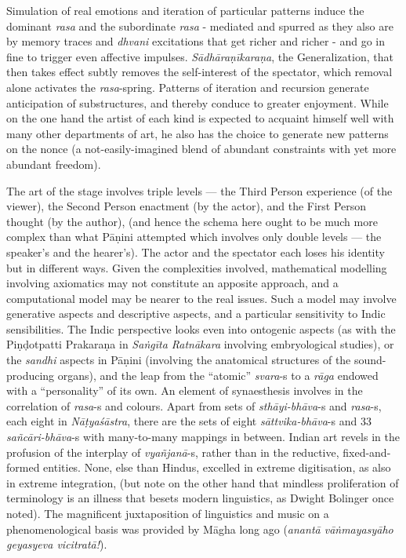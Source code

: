 Simulation of real emotions and iteration of particular patterns induce the dominant \textsl{rasa} and the subordinate \textsl{rasa} - mediated and spurred as they also are by memory traces and \textsl{dhvani} excitations that get richer and richer - and go in fine to trigger even affective impulses. \textsl{Sādhāraṇīkaraṇa}, the Generalization, that then takes effect subtly removes the self-interest of the spectator, which removal alone activates the \textsl{rasa}-spring. Patterns of iteration and recursion generate anticipation of substructures, and thereby conduce to greater enjoyment. While on the one hand the artist of each kind is expected to acquaint himself well with many other departments of art, he also has the choice to generate new patterns on the nonce (a not-easily-imagined blend of abundant constraints with yet more abundant freedom).

The art of the stage involves triple levels --- the Third Person experience (of the viewer), the Second Person enactment (by the actor), and the First Person thought (by the author), (and hence the schema here ought to be much more complex than what Pāṇini attempted which involves only double levels --- the speaker’s and the hearer’s). The actor and the spectator each loses his identity but in different ways. Given the complexities involved, mathematical modelling involving axiomatics may not constitute an apposite approach, and a computational  model may be nearer to the real issues. Such a model may involve generative aspects and descriptive aspects, and a particular sensitivity to Indic sensibilities. The Indic perspective looks even into ontogenic aspects (as with the Piṇḍotpatti Prakaraṇa in \textsl{Saṅgīta Ratnākara} involving embryological studies), or the \textsl{sandhi} aspects in Pāṇini (involving the anatomical structures of the sound-producing organs), and the leap from the “atomic” \textsl{svara}-s to a \textsl{rāga} endowed with a “personality” of its own. An element of synaesthesis involves in the correlation of \textsl{rasa}-s and colours. Apart from sets of \textsl{sthāyi-bhāva}-s and \textsl{rasa}-s, each eight in \textsl{Nāṭyaśāstra}, there are the sets of eight \textsl{sāttvika-bhāva}-s and 33 \textsl{sañcāri-bhāva}-s with many-to-many mappings in between. Indian art revels in the profusion of the interplay of \textsl{vyañjanā}-s, rather than in the reductive, fixed-and-formed entities. None, else than Hindus, excelled in extreme digitisation, as also in extreme integration, (but note on the other hand that mindless proliferation of terminology is an illness that besets modern linguistics, as Dwight Bolinger once noted). The magnificent juxtaposition of linguistics and music on a phenomenological basis was provided by Māgha long ago (\textsl{anantā vāṅmayasyāho geyasyeva vicitratā!}).
 
